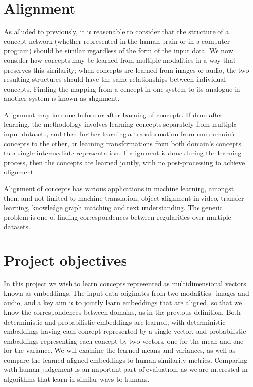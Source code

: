 \section{Alignment}

As alluded to previously, it is reasonable to consider that the structure of a concept network (whether represented in the human brain or in a computer program) should be similar regardless of the form of the input data. We now consider how concepts may be learned from multiple modalities in a way that preserves this similarity; when concepts are learned from images or audio, the two resulting structures should have the same relationships between individual concepts. Finding the mapping from a concept in one system to its analogue in another system is known as alignment. 

Alignment may be done before or after learning of concepts. If done after learning, the methodology involves learning concepts separately from multiple input datasets, and then further learning a transformation from one domain's concepts to the other, or learning transformations from both domain's concepts to a single intermediate representation. If alignment is done during the learning process, then the concepts are learned jointly, with no post-processing to achieve alignment. 

Alignment of concepts has various applications in machine learning, amongst them and not limited to machine translation, object alignment in video, transfer learning, knowledge graph matching and text understanding. The generic problem is one of finding correspondences between regularities over multiple datasets. 

\section{Project objectives}
In this project we wish to learn concepts represented as multidimensional vectors known as embeddings. The input data originates from two modalities- images and audio, and a key aim is to jointly learn embeddings that are aligned, so that we know the correspondences between domains, as in the previous definition. Both deterministic and probabilistic embeddings are learned, with deterministic embeddings having each concept represented by a single vector, and probabilistic embeddings representing each concept by two vectors, one for the mean and one for the variance. We will examine the learned means and variances, as well as compare the learned aligned embeddings to human similarity metrics. Comparing with human judgement is an important part of evaluation, as we are interested in algorithms that learn in similar ways to humans. 


